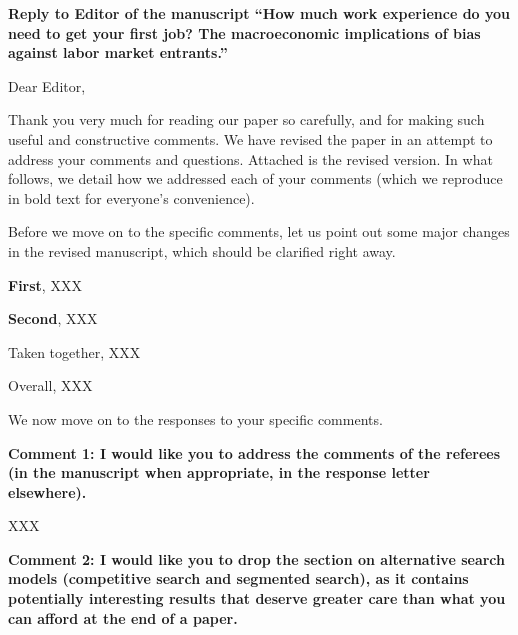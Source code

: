 \documentclass[12pt]{article}
\begin{document}
\theoremstyle{definition}
\newtheorem{definition}{Definition}%
\theoremstyle{definition}
\newtheorem{result}{Result}%
\theoremstyle{plain}
\newtheorem{lemma}{Lemma}%
\theoremstyle{plain}
\newtheorem{proposition}{Proposition}%
\theoremstyle{plain}
\newtheorem{theorem}{Theorem}%
\theoremstyle{plain}
\newtheorem{corollary}{Corollary}%

\begin{onehalfspacing}

\vspace{1.0cm}


\noindent \textbf{Reply to Editor of the manuscript ``How much work experience do you need to get your first job? The macroeconomic implications of bias against labor market entrants.''}

\bigskip

Dear Editor,

\medskip

Thank you very much for reading our paper so carefully, and for making such useful and constructive comments. We have revised the paper in an attempt to address your comments and questions. Attached is the revised version. In what follows, we detail how we addressed each of your comments (which we reproduce in bold text for everyone's convenience).

Before we move on to the specific comments, let us point out some major changes in the revised manuscript, which should be clarified right away. 

\textbf{First}, XXX 

\textbf{Second}, XXX   


Taken together, XXX

Overall, XXX


We now move on to the responses to your specific comments. 

\bigskip
\bigskip
\textbf{Comment 1: I would like you to address the comments of the referees (in the manuscript when appropriate, in the response letter elsewhere).}

\medskip
XXX

\bigskip
\bigskip
\textbf{Comment 2: I would like you to drop the section on alternative search models (competitive search and segmented search), as it contains potentially interesting results that deserve greater care than what you can afford at the end of a paper.}


\end{onehalfspacing}
\end{document}
